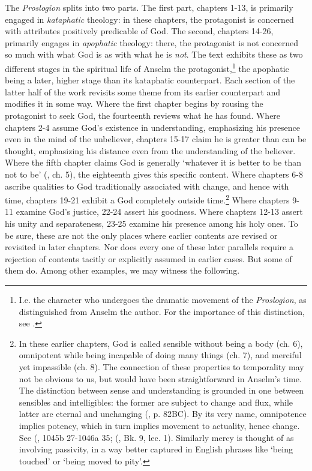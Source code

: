 \documentclass[]{birkjour}
\begin{document}
The \textit{Proslogion} splits into two parts. The first part, chapters 1-13, is primarily engaged in \textit{kataphatic} theology: in these chapters, the protagonist is concerned with attributes positively predicable of God. The second, chapters 14-26, primarily engages in \textit{apophatic} theology: there, the protagonist is not concerned so much with what God is as with what he is \textit{not}. The text exhibits these as two different stages in the spiritual life of Anselm the protagonist,\footnote{I.e. the character who undergoes the dramatic movement of the \textit{Proslogion}, as distinguished from Anselm the author. For the importance of this distinction, see \cite{McMahon2004}.} the apophatic being a later, higher stage than its kataphatic counterpart. Each section of the latter half of the work revisits some theme from its earlier counterpart and modifies it in some way. Where the first chapter begins by rousing the protagonist to seek God, the fourteenth reviews what he has found. Where chapters 2-4 assume God's existence in understanding, emphasizing his presence even in the mind of the unbeliever, chapters 15-17 claim he is greater than can be thought, emphasizing his distance even from the understanding of the believer. Where the fifth chapter claims God is generally `whatever it is better to be than not to be' (\cite{AnselmPros}, ch. 5), the eighteenth gives this specific content. Where chapters 6-8 ascribe qualities to God traditionally associated with change, and hence with time, chapters 19-21 exhibit a God completely outside time.\footnote{In these earlier chapters, God is called sensible without being a body (ch. 6), omnipotent while being incapable of doing many things (ch. 7), and merciful yet impassible (ch. 8). The connection of these properties to temporality may not be obvious to us, but would have been straightforward in Anselm's time. The distinction between sense and understanding is grounded in one between sensibles and intelligibles: the former are subject to change and flux, while latter are eternal and unchanging (\cite{BCP}, p. 82BC). By its very name, omnipotence implies potency, which in turn implies movement to actuality, hence change. See (\cite{Metaph}, 1045b 27-1046a 35; (\cite{AquinasMetaph}, Bk. 9, lec. 1). Similarly mercy is thought of as involving passivity, in a way better captured in English phrases like `being touched' or `being moved to pity'.} Where chapters 9-11 examine God's justice, 22-24 assert his goodness. Where chapters 12-13 assert his unity and separateness, 23-25 examine his presence among his holy ones. To be sure, these are not the only places where earlier contents are revised or revisited in later chapters. Nor does every one of these later parallels require a rejection of contents tacitly or explicitly assumed in earlier cases. But some of them do. Among other examples, we may witness the following.
\end{document}
